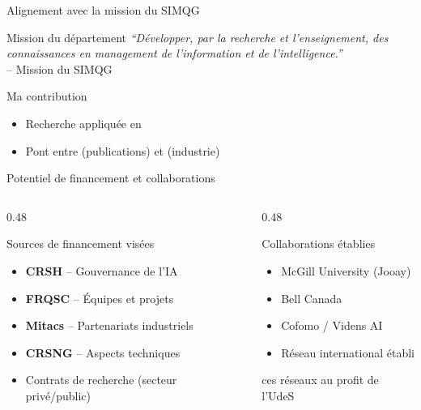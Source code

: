\documentclass[aspectratio=169,11pt]{beamer}
\begin{document}
\begin{frame}{Alignement avec la mission du SIMQG}
  \begin{block}{Mission du département}
    \centering
    {\large\textit{``Développer, par la recherche et l'enseignement, des connaissances en management de l'information et de l'intelligence.''}}\vspace{0.3em}\\
    {\small -- Mission du SIMQG}
  \end{block}
  
  \vspace{1em}
  \begin{alertblock}{Ma contribution}
    \begin{itemize}
      \item Recherche appliquée en 
      \item Pont entre  (publications) et  (industrie)
    \end{itemize}
  \end{alertblock}
\end{frame}

\begin{frame}{Potentiel de financement et collaborations}
  \begin{columns}[T]
    \begin{column}{0.48\textwidth}
      \begin{block}{Sources de financement visées}
        \begin{itemize}
          \item \textbf{CRSH} -- Gouvernance de l'IA
          \item \textbf{FRQSC} -- Équipes et projets
          \item \textbf{Mitacs} -- Partenariats industriels
          \item \textbf{CRSNG} -- Aspects techniques
          \item Contrats de recherche (secteur privé/public)
        \end{itemize}
      \end{block}
    \end{column}
    \begin{column}{0.48\textwidth}
      \begin{block}{Collaborations établies}
        \begin{itemize}
          \item McGill University (Jooay)
          \item Bell Canada
          \item Cofomo / Videns AI
          \item Réseau international établi
        \end{itemize}
        \vspace{0.3em}
         ces réseaux au profit de l'UdeS
      \end{block}
    \end{column}
  \end{columns}
\end{frame}
\end{document}
